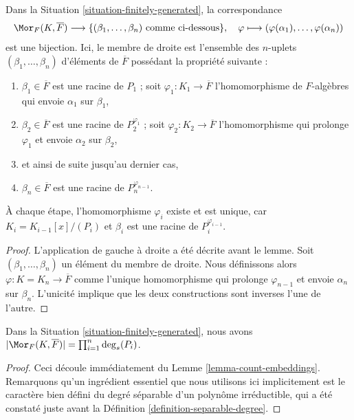 \begin{lemma}
\label{lemma-count-embeddings}
Dans la Situation \ref{situation-finitely-generated}, la correspondance
$$
\Mor_F(K, \overline{F})
\longrightarrow
\{(\beta_1, \ldots, \beta_n)\text{ comme ci-dessous}\},
\quad
\varphi \longmapsto (\varphi(\alpha_1), \ldots, \varphi(\alpha_n))
$$
est une bijection. Ici, le membre de droite est l'ensemble des $n$-uplets
$(\beta_1, \ldots, \beta_n)$ d'éléments de $\overline{F}$ possédant
la propriété suivante :
\begin{enumerate}
\item $\beta_1 \in \overline{F}$ est une racine de $P_1$ ;
soit $\varphi_1 : K_1 \to \overline{F}$ l'homomorphisme
de $F$-algèbres qui envoie $\alpha_1$ sur $\beta_1$,
\item $\beta_2 \in \overline{F}$ est une racine de $P_2^{\varphi_1}$ ;
soit $\varphi_2 : K_2 \to \overline{F}$ l'homomorphisme
qui prolonge $\varphi_1$ et envoie $\alpha_2$ sur $\beta_2$,
\item et ainsi de suite jusqu'au dernier cas,
\item $\beta_n \in \overline{F}$ est une racine de $P_n^{\varphi_{n - 1}}$.
\end{enumerate}
À chaque étape, l'homomorphisme $\varphi_i$ existe et est unique, car
$K_i = K_{i - 1}[x]/(P_i)$ et $\beta_i$ est une racine de $P_i^{\varphi_{i - 1}}$.
\end{lemma}

\begin{proof}
L'application de gauche à droite a été décrite avant le lemme.
Soit $(\beta_1, \ldots, \beta_n)$ un élément du membre de droite.
Nous définissons alors $\varphi : K = K_n \to \overline{F}$ comme l'unique homomorphisme
qui prolonge $\varphi_{n - 1}$ et envoie $\alpha_n$ sur $\beta_n$.
L'unicité implique que les deux constructions sont inverses l'une de l'autre.
\end{proof}

\begin{lemma}
\label{lemma-count-embeddings-explicitly}
Dans la Situation \ref{situation-finitely-generated}, nous avons
$|\Mor_F(K, \overline{F})| = \prod_{i = 1}^n \deg_s(P_i)$.
\end{lemma}

\begin{proof}
Ceci découle immédiatement du Lemme \ref{lemma-count-embeddings}.
Remarquons qu'un ingrédient essentiel que nous utilisons ici implicitement est le
caractère bien défini du degré séparable d'un polynôme irréductible,
qui a été constaté juste avant la
Définition \ref{definition-separable-degree}.
\end{proof}

